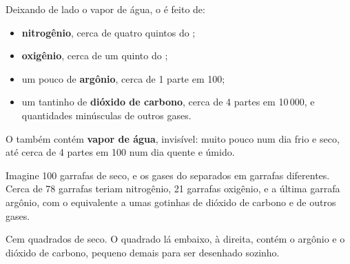 \begin{proposition}\label{prop:g4:air-a-mixture-of-gases:composition}
Deixando de lado o vapor de água, o  é feito de:
\begin{itemize}
  \item \textbf{nitrogênio}, cerca de quatro quintos do ;
  \item \textbf{oxigênio}, cerca de um quinto do ;
  \item um pouco de \textbf{argônio}, cerca de 1 parte em 100;
  \item um tantinho de \textbf{dióxido de carbono}, cerca de 4 partes em
        10\,000, e quantidades minúsculas de outros gases.
\end{itemize}
O  também contém \textbf{vapor de água}, invisível: muito pouco num
dia frio e seco, até cerca de 4 partes em 100 num dia quente e úmido.
\end{proposition}

\begin{example}\label{ex:g4:air-a-mixture-of-gases:hundred}
Imagine 100 garrafas de  seco, e os gases do  separados em garrafas
diferentes. Cerca de 78 garrafas teriam nitrogênio, 21 garrafas
oxigênio, e a última garrafa argônio, com o equivalente a umas gotinhas
de dióxido de carbono e de outros gases.
\end{example}

\begin{omfigure}

{\small Cem quadrados de  seco. O quadrado lá embaixo, à direita,
contém o argônio e o dióxido de carbono, pequeno demais para ser
desenhado sozinho.}
\end{omfigure}

